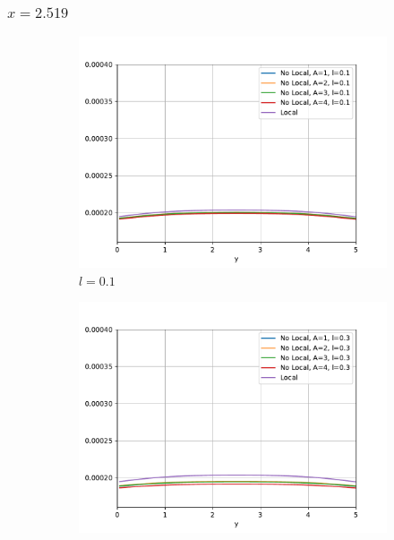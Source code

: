 	\subsubsection{\texorpdfstring{$x=2.519$}{x=2.519}}
		\begin{figure}
		    \centering
		    \sffamily
		    \begin{subfigure}{0.48\textwidth}
		    \centering
		        \includegraphics[width=\textwidth]{figuras/Placa/Perfiles/X/X0.1_2.519.pdf}
		        \caption{$l=0.1$}
		        \label{fig:perfilesX0259.01}
		    \end{subfigure}
		    \begin{subfigure}{0.48\textwidth}
		    \centering
		        \includegraphics[width=\textwidth]{figuras/Placa/Perfiles/X/X0.3_2.519.pdf}

\end{subfigure}
\end{figure}

